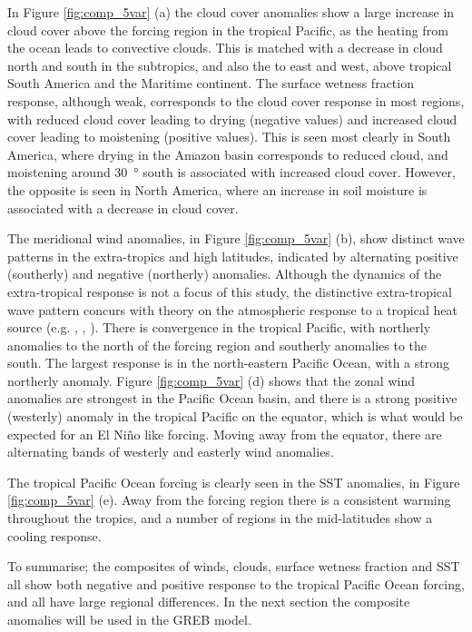 In Figure \ref{fig:comp_5var} (a) the cloud cover anomalies show a large 
increase in cloud cover above the forcing region in the tropical Pacific, as the 
heating from the ocean leads to convective clouds.  This is matched with a 
decrease in cloud north and south in the subtropics, and also the to east and 
west, above tropical South America and the Maritime continent. The surface 
wetness fraction response, although weak, corresponds to the cloud cover 
response in most regions, with reduced cloud cover leading to drying (negative 
values) and increased cloud cover leading to moistening (positive values). This 
is seen most clearly in South America, where drying in the Amazon basin 
corresponds to reduced cloud, and moistening around \SI{30}{\degree} south is 
associated with increased cloud cover. However, the opposite is seen in North 
America, where an increase in soil moisture is associated with a decrease in 
cloud cover. 

The meridional wind anomalies, in Figure \ref{fig:comp_5var} (b), show distinct 
wave patterns in the extra-tropics and high latitudes, indicated by alternating 
positive (southerly) and negative (northerly) anomalies. Although the dynamics 
of the extra-tropical response is not a focus of this study, the distinctive 
extra-tropical wave pattern concurs with theory on the atmospheric response to a 
tropical heat source (e.g. \citealt{Hoskins1981}, \citealt{Sardeshmukh1988}, 
\citealt{Held1989}).  There is convergence in the tropical Pacific, with northerly 
anomalies to the north of the forcing region and southerly anomalies to the 
south. The largest response is in the north-eastern Pacific Ocean, with a strong 
northerly anomaly.  Figure \ref{fig:comp_5var} (d) shows that the zonal wind 
anomalies are strongest in the Pacific Ocean basin, and there is a strong 
positive (westerly) anomaly in the tropical Pacific on the equator, which is 
what would be expected for an El Ni\~no like forcing.  Moving away from the 
equator, there are alternating bands of westerly and easterly wind anomalies.

The tropical Pacific Ocean forcing is clearly seen in the SST anomalies, in 
Figure \ref{fig:comp_5var} (e). Away from the forcing region there is a 
consistent warming throughout the tropics, and a number of regions in the 
mid-latitudes show a cooling response.

To summarise; the composites of winds, clouds, surface wetness fraction and SST all show 
both negative and positive response to the tropical Pacific Ocean forcing, and 
all have large regional differences. In the next section the composite anomalies 
will be used in the GREB model.

